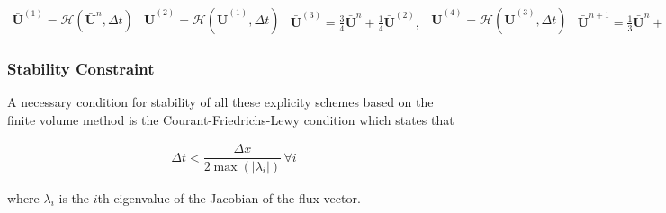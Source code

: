 \documentclass[SingleSpace,12pt]{Serre_ASCE}
\begin{document}
\begin{linenomath*}
\begin{subequations}
\begin{gather}\label{eq:SSPRK31}
\boldsymbol{\bar{U}}^{\left(1\right)} = \mathcal{H}\left(\boldsymbol{\bar{U}}^{n},\Delta t\right)
\end{gather}
\begin{gather}\label{eq:SSPRK32}
\boldsymbol{\bar{U}}^{\left(2\right)} = \mathcal{H}\left(\boldsymbol{\bar{U}}^{\left(1\right)},\Delta t\right)
\end{gather}
\begin{gather}\label{eq:SSPRK33}
\boldsymbol{\bar{U}}^{\left(3\right)}= \frac{3}{4}\boldsymbol{\bar{U}}^{n} + \frac{1}{4}\boldsymbol{\bar{U}}^{\left(2\right)} ,
\end{gather}
\begin{gather}\label{eq:SSPRK34}
\boldsymbol{\bar{U}}^{\left(4\right)} = \mathcal{H}\left(\boldsymbol{\bar{U}}^{\left(3\right)},\Delta t\right)
\end{gather}
\begin{gather}\label{eq:SSPRK35}
\boldsymbol{\bar{U}}^{n+1}= \frac{1}{3}\boldsymbol{\bar{U}}^{n} + \frac{2}{3}\boldsymbol{\bar{U}}^{\left(4\right)}.
\end{gather}
\end{subequations}
\label{eq:SSPRK3}
\end{linenomath*}
\subsubsection{Stability Constraint} %
A necessary condition for stability of all these explicity schemes based on the finite volume method is the Courant-Friedrichs-Lewy condition \cite{Courant-etal-1928-32} which states that
\begin{linenomath*}
\begin{gather} \label{eq:CFLcond}
\Delta t < \dfrac{\Delta x}{2 \max\left(\left|\lambda_i\right|\right)} \, \forall i
\end{gather}
\end{linenomath*}
where $\lambda_i$ is the $i$th eigenvalue of the Jacobian of the flux vector. 
\end{document}
